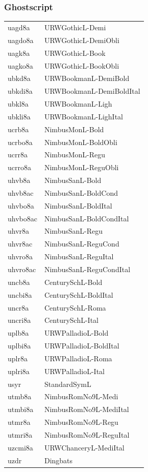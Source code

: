 \documentclass[%
    11pt,
    english,
    BCOR10mm,
    DIV12,
    bibliography=totoc,
    parskip=false,
    fleqn,
    smallheadings,
    headexclude,
    footexclude,
    oneside,
    dvipsnames,
    svgnames,
    x11names
]{pst-doc}
\begin{document}
{{{\begin{appendix}
\begin{minipage}[t]{0.45\linewidth}
\subsubsection*{Ghostscript}

\begin{tabular}{ll}
uagd8a    & URWGothicL-Demi           \\
uagdo8a   & URWGothicL-DemiObli       \\
uagk8a    & URWGothicL-Book           \\
uagko8a   & URWGothicL-BookObli       \\
ubkd8a    & URWBookmanL-DemiBold      \\
ubkdi8a   & URWBookmanL-DemiBoldItal  \\
ubkl8a    & URWBookmanL-Ligh          \\
ubkli8a   & URWBookmanL-LighItal      \\
ucrb8a    & NimbusMonL-Bold           \\
ucrbo8a   & NimbusMonL-BoldObli       \\
ucrr8a    & NimbusMonL-Regu           \\
ucrro8a   & NimbusMonL-ReguObli       \\
uhvb8a    & NimbusSanL-Bold           \\
uhvb8ac   & NimbusSanL-BoldCond       \\
uhvbo8a   & NimbusSanL-BoldItal       \\
uhvbo8ac  & NimbusSanL-BoldCondItal   \\
uhvr8a    & NimbusSanL-Regu           \\
uhvr8ac   & NimbusSanL-ReguCond       \\
uhvro8a   & NimbusSanL-ReguItal       \\
uhvro8ac  & NimbusSanL-ReguCondItal   \\
uncb8a    & CenturySchL-Bold          \\
uncbi8a   & CenturySchL-BoldItal      \\
uncr8a    & CenturySchL-Roma          \\
uncri8a   & CenturySchL-Ital          \\
uplb8a    & URWPalladioL-Bold         \\
uplbi8a   & URWPalladioL-BoldItal     \\
uplr8a    & URWPalladioL-Roma         \\
uplri8a   & URWPalladioL-Ital         \\
usyr      & StandardSymL              \\
utmb8a    & NimbusRomNo9L-Medi        \\
utmbi8a   & NimbusRomNo9L-MediItal    \\
utmr8a    & NimbusRomNo9L-Regu        \\
utmri8a   & NimbusRomNo9L-ReguItal    \\
uzcmi8a   & URWChanceryL-MediItal     \\
uzdr      & Dingbats
\end{tabular}
\end{minipage}
\hfill
\begin{minipage}[t]{0.45\linewidth}\kern0pt

\end{minipage}
\end{appendix}}}}
\end{document}
